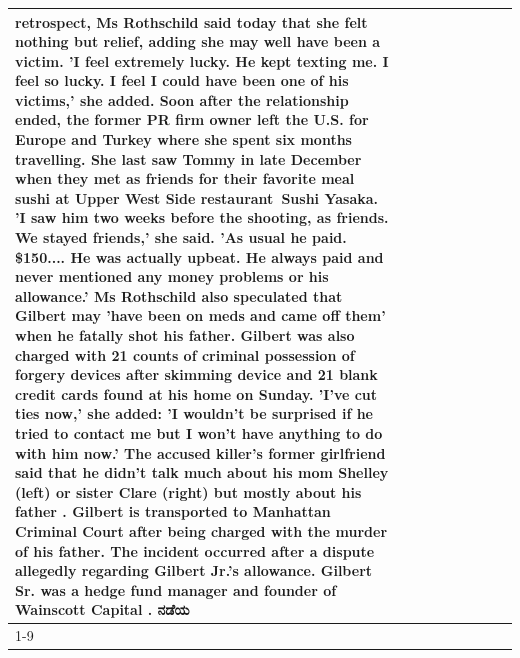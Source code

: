 \begin{table}[H]
\begin{tabular}{lllrlllll}
retrospect, Ms Rothschild said today that she felt nothing but relief, adding she may well have been a victim. 'I feel extremely lucky. He kept texting me. I feel so lucky. I feel I could have been one of his victims,' she added. Soon after the relationship ended, the former PR firm owner left the U.S. for Europe and Turkey where she spent six months  travelling. She last saw Tommy in late December when they met as friends for their favorite meal sushi at Upper West Side restaurant Sushi Yasaka. 'I saw him two weeks before the shooting, as friends. We stayed friends,' she said. 'As usual he paid. \$150.... He was actually upbeat. He always paid and never mentioned any money problems or his allowance.' Ms Rothschild also speculated that Gilbert may 'have been on meds and came off them' when he fatally shot his father. Gilbert was also charged with 21 counts of criminal possession of forgery devices after skimming device and 21 blank credit cards found at his home on Sunday. 'I've cut ties now,' she added: 'I wouldn’t be surprised if he tried to contact me but I won’t have anything to do with him now.' The accused killer's former girlfriend said that he didn't talk much about his mom Shelley (left) or sister Clare (right) but mostly about his father . Gilbert is transported to Manhattan Criminal Court  after being charged with the murder of his father. The incident occurred after a dispute allegedly regarding Gilbert Jr.'s allowance. Gilbert Sr. was a hedge fund manager and founder of Wainscott Capital . ನಡೆಯ \\
\cline{1-9} \cline{2-9}

\end{tabular}
\end{table}
